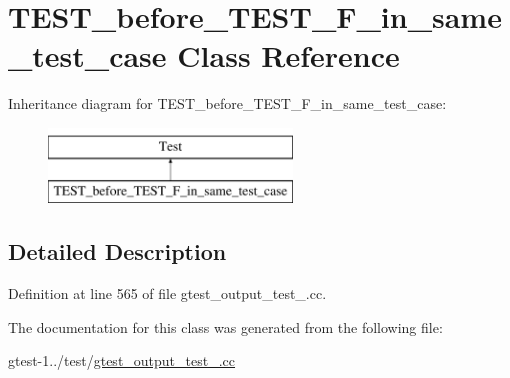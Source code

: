 \hypertarget{classTEST__before__TEST__F__in__same__test__case}{\section{\-T\-E\-S\-T\-\_\-before\-\_\-\-T\-E\-S\-T\-\_\-\-F\-\_\-in\-\_\-same\-\_\-test\-\_\-case \-Class \-Reference}
\label{d3/dc3/classTEST__before__TEST__F__in__same__test__case}
}
\-Inheritance diagram for \-T\-E\-S\-T\-\_\-before\-\_\-\-T\-E\-S\-T\-\_\-\-F\-\_\-in\-\_\-same\-\_\-test\-\_\-case\-:\begin{figure}[H]
\begin{center}
\leavevmode
\includegraphics[height=2.000000cm]{d3/dc3/classTEST__before__TEST__F__in__same__test__case}
\end{center}
\end{figure}


\subsection{\-Detailed \-Description}


\-Definition at line 565 of file gtest\-\_\-output\-\_\-test\-\_\-.\-cc.



\-The documentation for this class was generated from the following file\-:\begin{DoxyCompactItemize}
\item 
gtest-\/1../test/\hyperlink{gtest__output__test___8cc}{gtest\-\_\-output\-\_\-test\-\_\-.\-cc}\end{DoxyCompactItemize}
